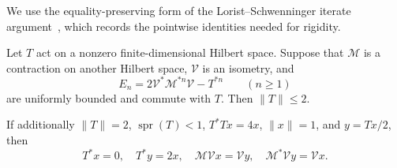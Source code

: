 \documentclass[preprints,article,submit,oneauthor]{Definitions/mdpi}
\numberwithin{equation}{section}
\newcommand{\spr}{\operatorname{spr}}
\begin{document}
We use the equality-preserving form of the Lorist--Schwenninger iterate
argument~\cite{LoristSchwenninger2026}, which records the pointwise identities
needed for rigidity.

\begin{Lemma}\label{lem:dilation}
Let \(T\) act on a nonzero finite-dimensional Hilbert space.  Suppose that \(\mathcal M\) is a
contraction on another Hilbert space, \(\mathcal V\) is an isometry, and
\[
 E_n=2\mathcal V^*\mathcal M^{*n}\mathcal V-T^{*n}\qquad(n\geq1)
\]
are uniformly bounded and commute with \(T\).  Then \(\|T\|\leq2\).

If additionally \(\|T\|=2\), \(\spr(T)<1\), \(T^*Tx=4x\), \(\|x\|=1\), and
\(y=Tx/2\), then
\[
 T^*x=0,\quad T^*y=2x,\quad
 \mathcal M\mathcal Vx=\mathcal Vy,\quad
 \mathcal M^*\mathcal Vy=\mathcal Vx.
\]
\end{Lemma}
\end{document}
